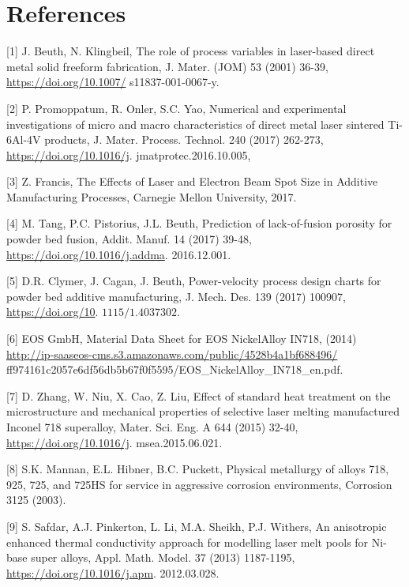 \documentclass[10pt]{article}
\begin{document}
\section*{References}
[1] J. Beuth, N. Klingbeil, The role of process variables in laser-based direct metal solid freeform fabrication, J. Mater. (JOM) 53 (2001) 36-39, \href{https://doi.org/10.1007/}{https://doi.org/10.1007/} s11837-001-0067-y.

[2] P. Promoppatum, R. Onler, S.C. Yao, Numerical and experimental investigations of micro and macro characteristics of direct metal laser sintered Ti-6Al-4V products, J. Mater. Process. Technol. 240 (2017) 262-273, \href{https://doi.org/10.1016/j}{https://doi.org/10.1016/j}. jmatprotec.2016.10.005,

[3] Z. Francis, The Effects of Laser and Electron Beam Spot Size in Additive Manufacturing Processes, Carnegie Mellon University, 2017.

[4] M. Tang, P.C. Pistorius, J.L. Beuth, Prediction of lack-of-fusion porosity for powder bed fusion, Addit. Manuf. 14 (2017) 39-48, \href{https://doi.org/10.1016/j.addma}{https://doi.org/10.1016/j.addma}. 2016.12.001.

[5] D.R. Clymer, J. Cagan, J. Beuth, Power-velocity process design charts for powder bed additive manufacturing, J. Mech. Des. 139 (2017) 100907, \href{https://doi.org/10}{https://doi.org/10}. $1115 / 1.4037302$.

[6] EOS GmbH, Material Data Sheet for EOS NickelAlloy IN718, (2014) \href{http://ip-saaseos-cms.s3.amazonaws.com/public/4528b4a1bf688496/}{http://ip-saaseos-cms.s3.amazonaws.com/public/4528b4a1bf688496/} ff974161c2057e6df56db5b67f0f5595/EOS\_NickelAlloy\_IN718\_en.pdf.

[7] D. Zhang, W. Niu, X. Cao, Z. Liu, Effect of standard heat treatment on the microstructure and mechanical properties of selective laser melting manufactured Inconel 718 superalloy, Mater. Sci. Eng. A 644 (2015) 32-40, \href{https://doi.org/10.1016/j}{https://doi.org/10.1016/j}. msea.2015.06.021.

[8] S.K. Mannan, E.L. Hibner, B.C. Puckett, Physical metallurgy of alloys 718, 925, 725, and 725HS for service in aggressive corrosion environments, Corrosion 3125 (2003).

[9] S. Safdar, A.J. Pinkerton, L. Li, M.A. Sheikh, P.J. Withers, An anisotropic enhanced thermal conductivity approach for modelling laser melt pools for Ni-base super alloys, Appl. Math. Model. 37 (2013) 1187-1195, \href{https://doi.org/10.1016/j.apm}{https://doi.org/10.1016/j.apm}. 2012.03.028.
\end{document}
